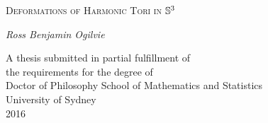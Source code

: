 
\cleardoublepage\thispagestyle{empty}
\begin{center}
{\huge{\scshape Deformations of Harmonic Tori in} $\S^3$\par}
\vspace{2cm}
{\Large\itshape Ross Benjamin Ogilvie \par}
\vfil\vfil\vfil
    A thesis submitted in partial fulfillment of\\
    the requirements for the degree of\\
    Doctor of Philosophy
\vfil\vfil
  {\large{School of Mathematics and Statistics}\\[5pt]
  University of Sydney}\\
  \vskip6mm
\vfil
  \normalsize 2016
\vfil
\end{center}
\cleardoublepage
